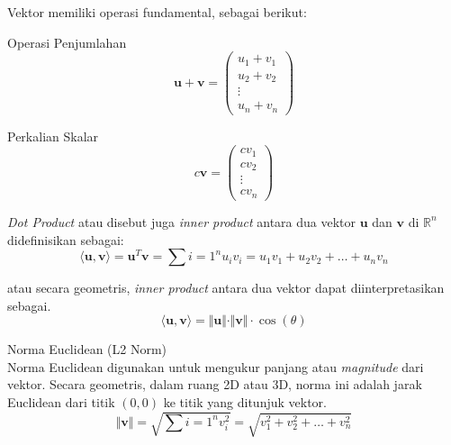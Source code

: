 Vektor memiliki operasi fundamental, sebagai berikut:
\begin{IEEEitemize}
    \item  Operasi Penjumlahan
        $$
        \mathbf{u} + \mathbf{v} = \begin{pmatrix}
            u_1 + v_1 \\
            u_2 + v_2 \\
            \vdots \\
            u_n + v_n
        \end{pmatrix}
        $$

    \item Perkalian Skalar
        $$
        c\mathbf{v} = \begin{pmatrix}
            c v_1 \\
            c v_2 \\
            \vdots \\
            c v_n
        \end{pmatrix}
        $$
    \item \textit{Dot Product} atau disebut juga \textit{inner product} antara dua vektor $\mathbf{u}$ dan $\mathbf{v}$ di $\mathbb{R}^n$ didefinisikan sebagai:
        $$
        \langle \mathbf{u}, \mathbf{v} \rangle = \mathbf{u}^T \mathbf{v} = \sum{i = 1}^{n} u_i v_i = u_1v_1 + u_2v_2 + \dots + u_n v_n
        $$
        
        atau secara geometris, \textit{inner product} antara dua vektor dapat diinterpretasikan sebagai.
        $$
        \langle \mathbf{u}, \mathbf{v} \rangle = \Vert \mathbf{u} \Vert \cdot \Vert \mathbf{v} \Vert \cdot \cos{(\theta)}
        $$

    \item Norma Euclidean (L2 Norm) \\
        Norma Euclidean digunakan untuk mengukur panjang atau \textit{magnitude} dari vektor. Secara geometris, dalam ruang 2D atau 3D, norma ini adalah jarak Euclidean dari titik $(0,0)$ ke titik yang ditunjuk vektor. 
        $$
        \Vert \mathbf{v} \Vert = \sqrt{\sum{i = 1}^{n} v_i^2} = \sqrt{v_1^2 + v_2^2 + \dots + v_n^2}
        $$
\end{IEEEitemize}
